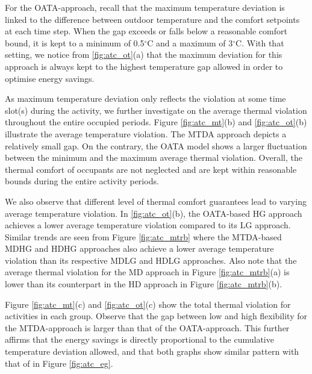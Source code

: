 For the OATA-approach, recall that the maximum temperature deviation is linked to the difference between outdoor temperature and the comfort setpoints at each time step. When the gap exceeds or falls below a reasonable comfort bound, it is kept to a minimum of 0.5$^\circ$C and a maximum of 3$^\circ$C. With that setting, we notice from \ref{fig:atc_ot}(a) that the maximum deviation for this approach is always kept to the highest temperature gap allowed in order to optimise energy savings.

As maximum temperature deviation only reflects the violation at some time slot(s) during the activity, we further investigate on the average thermal violation throughout the entire occupied periods. Figure \ref{fig:atc_mt}(b) and \ref{fig:atc_ot}(b) illustrate the average temperature violation. %
The MTDA approach depicts a relatively small gap. On the contrary, the OATA model shows a larger fluctuation between the minimum and the maximum average thermal violation. Overall, the thermal comfort of occupants are not neglected and are kept within reasonable bounds during the entire activity periods. 

We also observe that different level of thermal comfort guarantees lead to varying average temperature violation. In \ref{fig:atc_ot}(b),  the OATA-based HG approach achieves a lower average temperature violation compared to its LG approach. Similar trends are seen from Figure \ref{fig:atc_mtrb} where the MTDA-based MDHG and HDHG approaches also achieve a lower average temperature violation than its respective MDLG and HDLG approaches. Also note that the average thermal violation for the MD approach in Figure \ref{fig:atc_mtrb}(a) is lower than its counterpart in the HD approach in Figure \ref{fig:atc_mtrb}(b). 

Figure \ref{fig:atc_mt}(c) and \ref{fig:atc_ot}(c) show the total thermal violation for activities in each group. Observe that the gap between low and high flexibility for the MTDA-approach is larger than that of the OATA-approach. This further affirms that the energy savings is directly proportional to the cumulative temperature deviation allowed, and that both graphs show similar pattern with that of in Figure \ref{fig:atc_eg}.


